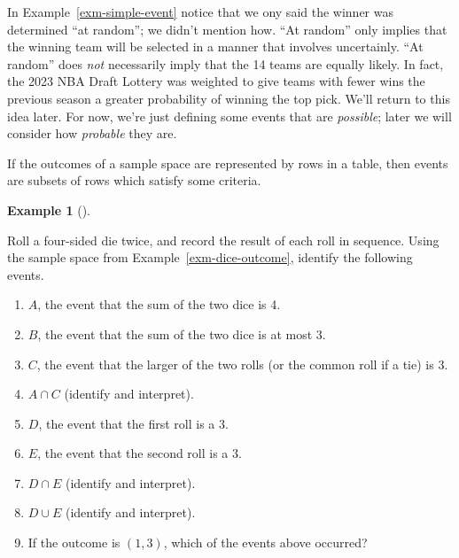 \documentclass[
  letterpaper,
  DIV=11,
  numbers=noendperiod]{scrreprt}
\providecommand{\tightlist}{%
  \setlength{\itemsep}{0pt}\setlength{\parskip}{0pt}}
\theoremstyle{plain}
\theoremstyle{definition}
\newtheorem{example}{Example}[chapter]
\theoremstyle{definition}
\theoremstyle{definition}
\theoremstyle{remark}
\begin{document}
In Example~\ref{exm-simple-event} notice that we ony said the winner was
determined ``at random''; we didn't mention how. ``At random'' only
implies that the winning team will be selected in a manner that involves
uncertainly. ``At random'' does \emph{not} necessarily imply that the 14
teams are equally likely. In fact, the 2023 NBA Draft Lottery was
weighted to give teams with fewer wins the previous season a greater
probability of winning the top pick. We'll return to this idea later.
For now, we're just defining some events that are \emph{possible}; later
we will consider how \emph{probable} they are.

If the outcomes of a sample space are represented by rows in a table,
then events are subsets of rows which satisfy some criteria.

\begin{tcolorbox}[enhanced jigsaw, opacityback=0, left=2mm, colframe=quarto-callout-note-color-frame, toprule=.15mm, breakable, colback=white, leftrule=.75mm, arc=.35mm, rightrule=.15mm, bottomrule=.15mm]

\begin{example}[]\protect\hypertarget{exm-dice-event}{}\label{exm-dice-event}

Roll a four-sided die twice, and record the result of each roll in
sequence. Using the sample space from Example~\ref{exm-dice-outcome},
identify the following events.

\begin{enumerate}
\def\labelenumi{\arabic{enumi}.}
\tightlist
\item
  \(A\), the event that the sum of the two dice is 4.
\item
  \(B\), the event that the sum of the two dice is at most 3.
\item
  \(C\), the event that the larger of the two rolls (or the common roll
  if a tie) is 3.
\item
  \(A\cap C\) (identify and interpret).
\item
  \(D\), the event that the first roll is a 3.
\item
  \(E\), the event that the second roll is a 3.
\item
  \(D \cap E\) (identify and interpret).
\item
  \(D \cup E\) (identify and interpret).
\item
  If the outcome is \((1, 3)\), which of the events above occurred?
\end{enumerate}

\end{example}

\end{tcolorbox}
\end{document}
